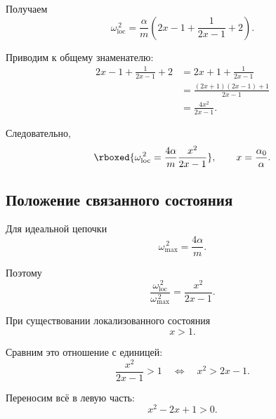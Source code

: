 \documentclass[../final.tex]{subfiles}
\begin{document}
Получаем
%
\begin{equation*}
    \omega_{\mathrm{loc}}^{\,2}
    =
    \frac{\alpha}{m}
    \left(
        2x-1
        +
        \frac{1}{2x-1}
        +
        2
    \right).
\end{equation*}

Приводим к общему знаменателю:
%
\begin{align*}
    2x-1
    +
    \frac{1}{2x-1}
    +
    2
    &=
    2x+1
    +
    \frac{1}{2x-1}
    \\
    &=
    \frac{
        (2x+1)(2x-1)+1
    }{
        2x-1
    }
    \\
    &=
    \frac{4x^2}{2x-1}.
\end{align*}

Следовательно,
%
\begin{equation*}
    \rboxed{
        \omega_{\mathrm{loc}}^{\,2}
        =
        \frac{4\alpha}{m}
        \frac{x^2}{2x-1}
    },
    \qquad
    x=\frac{\alpha_0}{\alpha}.
\end{equation*}



\subsection*{Положение связанного состояния}

Для идеальной цепочки
%
\begin{equation*}
    \omega_{\max}^{\,2}
    =
    \frac{4\alpha}{m}.
\end{equation*}

Поэтому
%
\begin{equation*}
    \frac{
        \omega_{\mathrm{loc}}^{\,2}
    }{
        \omega_{\max}^{\,2}
    }
    =
    \frac{x^2}{2x-1}.
\end{equation*}

При существовании локализованного состояния
%
\begin{equation*}
    x>1.
\end{equation*}

Сравним это отношение с единицей:
%
\begin{equation*}
    \frac{x^2}{2x-1}>1
    \quad\Longleftrightarrow\quad
    x^2>2x-1.
\end{equation*}

Переносим всё в левую часть:
%
\begin{equation*}
    x^2-2x+1>0.
\end{equation*}
\end{document}

